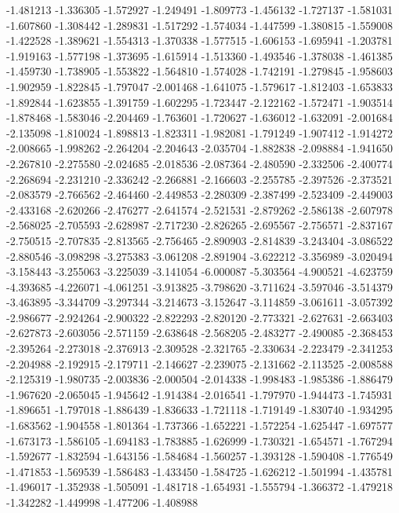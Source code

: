 -1.481213
-1.336305
-1.572927
-1.249491
-1.809773
-1.456132
-1.727137
-1.581031
-1.607860
-1.308442
-1.289831
-1.517292
-1.574034
-1.447599
-1.380815
-1.559008
-1.422528
-1.389621
-1.554313
-1.370338
-1.577515
-1.606153
-1.695941
-1.203781
-1.919163
-1.577198
-1.373695
-1.615914
-1.513360
-1.493546
-1.378038
-1.461385
-1.459730
-1.738905
-1.553822
-1.564810
-1.574028
-1.742191
-1.279845
-1.958603
-1.902959
-1.822845
-1.797047
-2.001468
-1.641075
-1.579617
-1.812403
-1.653833
-1.892844
-1.623855
-1.391759
-1.602295
-1.723447
-2.122162
-1.572471
-1.903514
-1.878468
-1.583046
-2.204469
-1.763601
-1.720627
-1.636012
-1.632091
-2.001684
-2.135098
-1.810024
-1.898813
-1.823311
-1.982081
-1.791249
-1.907412
-1.914272
-2.008665
-1.998262
-2.264204
-2.204643
-2.035704
-1.882838
-2.098884
-1.941650
-2.267810
-2.275580
-2.024685
-2.018536
-2.087364
-2.480590
-2.332506
-2.400774
-2.268694
-2.231210
-2.336242
-2.266881
-2.166603
-2.255785
-2.397526
-2.373521
-2.083579
-2.766562
-2.464460
-2.449853
-2.280309
-2.387499
-2.523409
-2.449003
-2.433168
-2.620266
-2.476277
-2.641574
-2.521531
-2.879262
-2.586138
-2.607978
-2.568025
-2.705593
-2.628987
-2.717230
-2.826265
-2.695567
-2.756571
-2.837167
-2.750515
-2.707835
-2.813565
-2.756465
-2.890903
-2.814839
-3.243404
-3.086522
-2.880546
-3.098298
-3.275383
-3.061208
-2.891904
-3.622212
-3.356989
-3.020494
-3.158443
-3.255063
-3.225039
-3.141054
-6.000087
-5.303564
-4.900521
-4.623759
-4.393685
-4.226071
-4.061251
-3.913825
-3.798620
-3.711624
-3.597046
-3.514379
-3.463895
-3.344709
-3.297344
-3.214673
-3.152647
-3.114859
-3.061611
-3.057392
-2.986677
-2.924264
-2.900322
-2.822293
-2.820120
-2.773321
-2.627631
-2.663403
-2.627873
-2.603056
-2.571159
-2.638648
-2.568205
-2.483277
-2.490085
-2.368453
-2.395264
-2.273018
-2.376913
-2.309528
-2.321765
-2.330634
-2.223479
-2.341253
-2.204988
-2.192915
-2.179711
-2.146627
-2.239075
-2.131662
-2.113525
-2.008588
-2.125319
-1.980735
-2.003836
-2.000504
-2.014338
-1.998483
-1.985386
-1.886479
-1.967620
-2.065045
-1.945642
-1.914384
-2.016541
-1.797970
-1.944473
-1.745931
-1.896651
-1.797018
-1.886439
-1.836633
-1.721118
-1.719149
-1.830740
-1.934295
-1.683562
-1.904558
-1.801364
-1.737366
-1.652221
-1.572254
-1.625447
-1.697577
-1.673173
-1.586105
-1.694183
-1.783885
-1.626999
-1.730321
-1.654571
-1.767294
-1.592677
-1.832594
-1.643156
-1.584684
-1.560257
-1.393128
-1.590408
-1.776549
-1.471853
-1.569539
-1.586483
-1.433450
-1.584725
-1.626212
-1.501994
-1.435781
-1.496017
-1.352938
-1.505091
-1.481718
-1.654931
-1.555794
-1.366372
-1.479218
-1.342282
-1.449998
-1.477206
-1.408988
